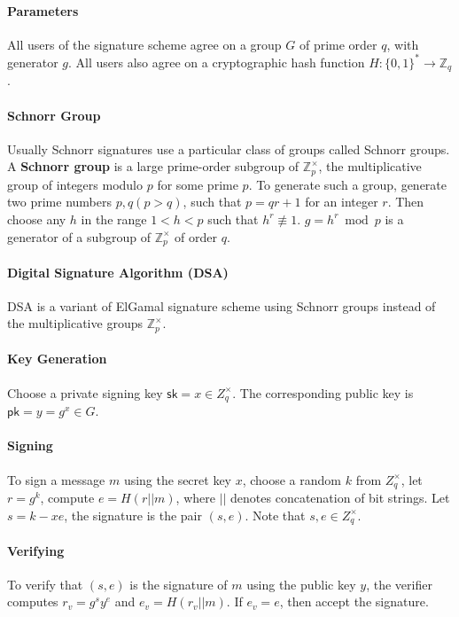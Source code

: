 \paragraph{Parameters} All users of the signature scheme agree on a group $G$ of prime order $q$, with generator $g$. All users also agree on a cryptographic hash function $H:\{0,1\}^*\to \mathbb{Z}_q$. 

\paragraph{Schnorr Group} Usually Schnorr signatures use a particular class of groups called Schnorr groups. A \textbf{Schnorr group} is a large prime-order subgroup of $\mathbb{Z}_p^{\times}$, the multiplicative group of integers modulo $p$ for some prime $p$. To generate such a group, generate two prime numbers $p, q (p>q)$, such that $p=qr+1$ for an integer $r$. Then choose any $h$ in the range $1<h<p$ such that $h^r\not\equiv 1$. $g=h^r\bmod p$ is a generator of a subgroup of $\mathbb{Z}_p^\times$ of order $q$. 

\paragraph{Digital Signature Algorithm (DSA)} DSA is a variant of ElGamal signature scheme using Schnorr groups instead of the multiplicative groups $\mathbb{Z}_p^\times$. 

\paragraph{Key Generation} Choose a private signing key $\mathsf{sk}=x\in Z_q^\times$. The corresponding public key is $\mathsf{pk}=y=g^x \in G$. 

\paragraph{Signing} To sign a message $m$ using the secret key $x$, choose a random $k$ from $Z_q^\times$, let $r=g^k$, compute $e=H(r||m)$, where $||$ denotes concatenation of bit strings. Let $s=k-xe$, the signature is the pair $(s,e)$. Note that $s, e\in Z_q^\times$. 

\paragraph{Verifying} To verify that $(s,e)$ is the signature of $m$ using the public key $y$, the verifier computes $r_v = g^s y^e$ and $e_v = H(r_v||m)$. If $e_v=e$, then accept the signature. 


